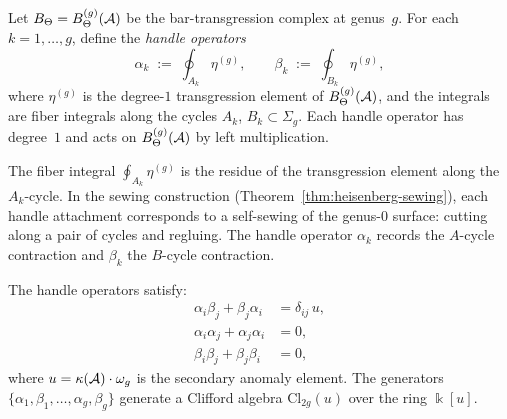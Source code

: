 \begin{definition}
\label{def:handle-operators}
Let $B_\Theta = B_\Theta^{(g)}(\mathcal{A})$ be the bar-transgression complex
at genus~$g$. For each $k = 1, \ldots, g$, define the
\emph{handle operators}
\begin{equation}\label{eq:g9-handle-ops}
\alpha_k \;:=\; \oint_{A_k} \eta^{(g)},
\qquad
\beta_k \;:=\; \oint_{B_k} \eta^{(g)},
\end{equation}
where $\eta^{(g)}$ is the degree-$1$ transgression element of
$B_\Theta^{(g)}(\mathcal{A})$, and the integrals are fiber integrals along
the cycles $A_k$, $B_k \subset \Sigma_g$. Each handle operator has
degree~$1$ and acts on $B_\Theta^{(g)}(\mathcal{A})$ by left multiplication.
\end{definition}

\begin{remark}
\label{rem:g9-handle-geometric}
The fiber integral $\oint_{A_k} \eta^{(g)}$ is the residue of the
transgression element along the $A_k$-cycle. In the sewing
construction (Theorem~\ref{thm:heisenberg-sewing}), each handle
attachment corresponds to a self-sewing of the genus-$0$ surface:
cutting along a pair of cycles and regluing. The handle operator
$\alpha_k$ records the $A$-cycle contraction and $\beta_k$ the
$B$-cycle contraction.
\end{remark}

\begin{theorem}
\label{thm:clifford-relations}
The handle operators satisfy:
\begin{align}
\alpha_i \beta_j + \beta_j \alpha_i &= \delta_{ij}\, u,
\label{eq:g9-clifford-ab} \\
\alpha_i \alpha_j + \alpha_j \alpha_i &= 0,
\label{eq:g9-clifford-aa} \\
\beta_i \beta_j + \beta_j \beta_i &= 0,
\label{eq:g9-clifford-bb}
\end{align}
where $u = \kappa(\mathcal{A}) \cdot \omega_g$ is the secondary anomaly
element. The generators
$\{\alpha_1, \beta_1, \ldots, \alpha_g, \beta_g\}$
generate a Clifford algebra $\mathrm{Cl}_{2g}(u)$ over the ring
$\Bbbk[u]$.
\end{theorem}

